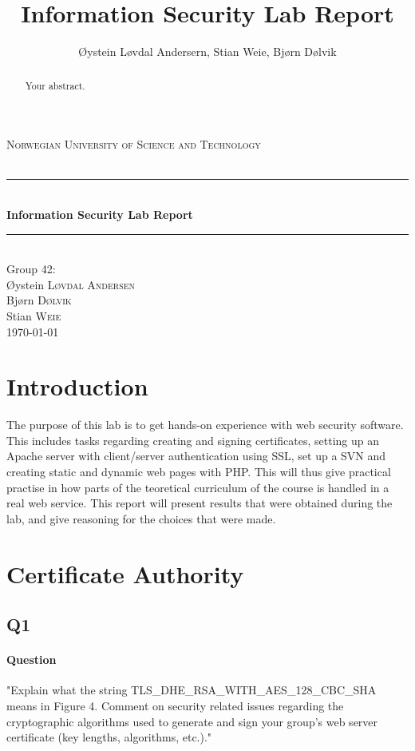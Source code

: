 \documentclass[11pt, a4paper]{article}
\title{Information Security Lab Report}
\author{Øystein Løvdal Andersern, Stian Weie, Bjørn Dølvik}
\newcommand{\HRule}{\rule{\linewidth}{0.5mm}}
\begin{document}
\begin{titlepage}
\begin{center}

\textsc{\LARGE Norwegian University of Science and Technology}\\[1.5cm]

\textsc{\Large }\\[0.5cm]

\HRule \\[0.4cm]
{ \huge \bfseries Information Security Lab Report \\[0.4cm] }

\HRule \\[1.5cm]

{\large Group 42:}\\[0.5cm]

Øystein \textsc{Løvdal Andersen}\\
Bjørn \textsc{Dølvik}\\
Stian \textsc{Weie}\\[4.0cm]

{\large \today}

\end{center}
\end{titlepage}

\begin{abstract}
Your abstract.
\end{abstract}
\tableofcontents
\clearpage

\section{Introduction}
The purpose of this lab is to get hands-on experience with web security software. This includes tasks regarding creating and signing certificates, setting up an Apache server with client/server authentication using SSL, set up a SVN and creating static and dynamic web pages with PHP. This will thus give practical practise in how parts of the teoretical curriculum of the course is handled in a real web service. This report will present results that were obtained during the lab, and give reasoning for the choices that were made. 
\section{Certificate Authority}
\subsection{Q1}
\paragraph{Question}
"Explain what the string TLS\_DHE\_RSA\_WITH\_AES\_128\_CBC\_SHA means in Figure 4. Comment on security related issues regarding the cryptographic algorithms used to generate and sign your group’s web server certificate (key lengths, algorithms, etc.)."
\end{document}
